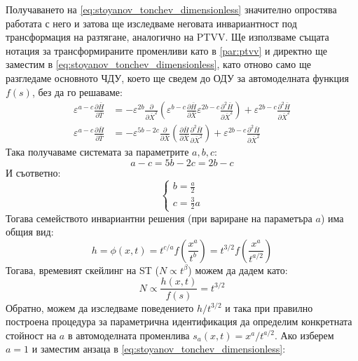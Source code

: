 Получаването на \autoref{eq:stoyanov_tonchev_dimensionless} значително опростява работата с него и затова ще изследваме неговата инвариантност под трансформация на разтягане, аналогично на PTVV. Ще използваме същата нотация за трансформираните променливи като в \autoref{par:ptvv} и директно ще заместим в \autoref{eq:stoyanov_tonchev_dimensionless}, като отново само ще разгледаме основното ЧДУ, което ще сведем до ОДУ за автомоделната функция $f(s)$, без да го решаваме:
\begin{align*}
    {\varepsilon ^{a - c}}\frac{{\partial \bar H}}{{\partial \bar T}} &=  - {\varepsilon ^{2b}}\frac{\partial }{{\partial {{\bar X}^2}}}\left( {{\varepsilon ^{b - c}}\frac{{\partial \bar H}}{{\partial \bar X}}{\varepsilon ^{2b - c}}\frac{{{\partial ^2}\bar H}}{{\partial {{\bar X}^2}}}} \right) + {\varepsilon ^{2b - c}}\frac{{{\partial ^2}\bar H}}{{\partial {{\bar X}^2}}} \\
    {\varepsilon ^{a - c}}\frac{{\partial \bar H}}{{\partial \bar T}} &=  - {\varepsilon ^{5b - 2c}}\frac{\partial }{{\partial \bar X}}\left( {\frac{{\partial \bar H}}{{\partial \bar X}}\frac{{{\partial ^2}\bar H}}{{\partial {{\bar X}^2}}}} \right) + {\varepsilon ^{2b - c}}\frac{{{\partial ^2}\bar H}}{{\partial {{\bar X}^2}}}
\end{align*}
Така получаваме системата за параметрите $a, b, c$:
\begin{equation*}
    a - c = 5b - 2c = 2b - c
\end{equation*}
И съответно:
\begin{equation}
    \begin{cases}
        b = \frac{a}{2} \\
        c = \frac{3}{2} a
    \end{cases} 
\end{equation}
Тогава семейството инвариантни решения (при вариране на параметъра $a$) има общия вид:
\begin{equation}
        h = \phi (x,t) = {t^{c/a}}f\left( {\frac{{{x^a}}}{{{t^b}}}} \right) = {t^{3/2}}f\left( {\frac{{{x^a}}}{{{t^{a/2}}}}} \right)
\end{equation}
Тогава, времевият скейлинг на ST ($N \propto t^\beta$) можем да дадем като:
\begin{equation}
    N \propto \frac{h(x,t)}{f(s)} = t^{3/2}
\end{equation}
Обратно, можем да изследваме поведението $h/t^{3/2}$ и така при правилно построена процедура за параметрична идентификация да определим конкретната стойност на $a$ в автомоделната променлива $s_a(x,t) = x^a/t^{a/2}$. Ако изберем $a = 1$ и заместим анзаца в \autoref{eq:stoyanov_tonchev_dimensionless}:
